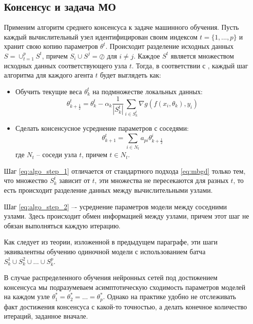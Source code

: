 \documentclass[a4paper,article,14pt]{extarticle}
\begin{document}
\subsection{Консенсус и задача МО}
Применим алгоритм среднего консенсуса к задаче машинного обучения. Пусть каждый вычислительный узел идентифицирован своим индексом $t = \{1, \ldots, p \}$ и хранит свою копию параметров $\theta^t$. Происходит разделение исходных данных $S = \cup_{t=1}^p S^t$, причем $S_i \cup S^j = \oslash \text{ для } i \ne j$. Каждое $S^t$ является множеством исходных данных соответствующего узла $t$. Тогда, в соответствии с \cite{decentralized_sgd}, каждый шаг алгоритма для каждого агента $t$ будет выглядеть как:
\begin{itemize}
\item
    Обучить текущие веса $\theta_k^t$ на подмножестве локальных данных:
     \begin{equation} \label{eq:algo_step_1}
    \theta_{k+\frac{1}{2}}^t =
    \theta_k^t - \alpha_k\frac{1}{|S_k^t|}\sum_{i\in S_k^t}\nabla g(f(x_i, \theta_k), y_i)
    \end{equation}

\item
    Сделать консенсусное усреднение параметров с соседями:
     \begin{equation} \label{eq:algo_step_2}
     \theta_{k+1}^t =
     \sum_{i \in N_t}a_{pi}\theta_{k+\frac{1}{2}}^i
     \end{equation}
где $N_t$ -- соседи узла $t$, причем $t \in N_t$.
\end{itemize}

Шаг \ref{eq:algo_step_1} отличается от стандартного подхода \ref{eq:mbgd} только тем, что множество $S_k^t$ зависит от $t$, эти множества не пересекаются для разных $t$, то есть происходит разделение данных между вычислительными узлами.

Шаг \ref{eq:algo_step_2} –- усреднение параметров модели  между соседними узлами. Здесь происходит обмен информацией между узлами, причем этот шаг не обязан выполняться каждую итерацию.

Как следует из теории, изложенной в предыдущем параграфе, эти шаги эквивалентны обучению одиночной модели с использованием батча $S_k^1 \cup S_k^2 \cup \ldots \cup S_k^p$.

В случае распределенного обучения нейронных сетей под достижением консенсуса мы подразумеваем асимптотическую сходимость параметров моделей на каждом узле $\theta_1^*=\theta_2^*=\ldots=\theta_p^*$.
Однако на практике удобно не отслеживать факт достижения консенсуса с какой-то точностью, а делать конечное количество итераций, заданное вначале.
\pagebreak
\end{document}
